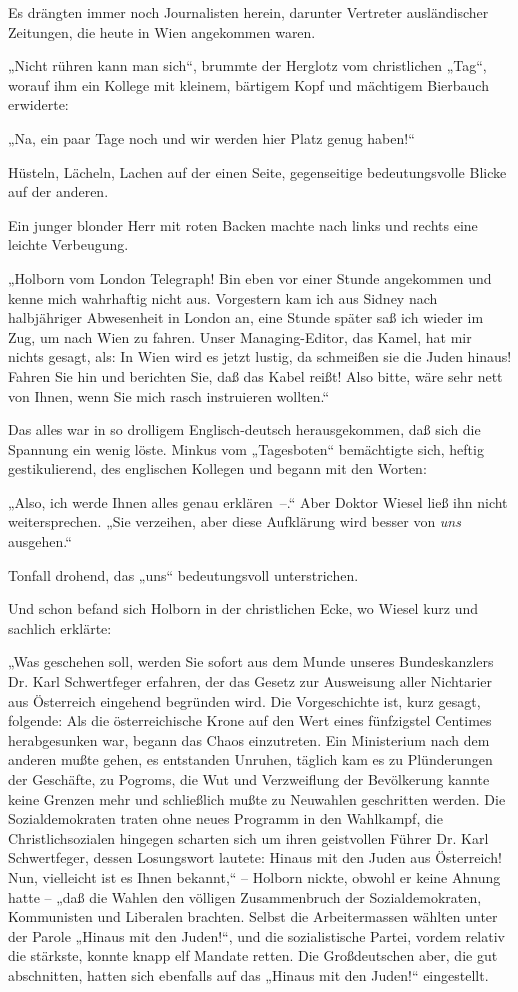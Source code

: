 Es drängten immer noch Journalisten herein, darunter Vertreter
ausländischer Zeitungen, die heute in Wien angekommen waren.

„Nicht rühren kann man sich“, brummte der Herglotz vom christlichen
„Tag“, worauf ihm ein Kollege mit kleinem, bärtigem Kopf und
mächtigem Bierbauch erwiderte:

„Na, ein paar Tage noch und wir werden hier Platz genug haben!“

Hüsteln, Lächeln, Lachen auf der einen Seite, gegenseitige
bedeutungsvolle Blicke auf der anderen.

Ein junger blonder Herr mit roten Backen machte nach
links und rechts eine leichte Verbeugung.

„Holborn vom \glq{}London Telegraph\grq{}! Bin eben vor einer Stunde
angekommen und kenne mich wahrhaftig nicht aus. Vorgestern kam ich
aus Sidney nach halbjähriger Abwesenheit in London an, eine Stunde
später saß ich wieder im Zug, um nach Wien zu fahren. Unser
Managing-Editor, das Kamel, hat mir nichts gesagt, als: In Wien
wird es jetzt lustig, da schmeißen sie die Juden hinaus! Fahren Sie
hin und berichten Sie, daß das Kabel reißt! Also bitte, wäre sehr
nett von Ihnen, wenn Sie mich rasch instruieren wollten.“

Das alles war in so drolligem Englisch-deutsch herausgekommen, daß
sich die Spannung ein wenig löste. Minkus vom „Tagesboten“
bemächtigte sich, heftig gestikulierend, des englischen Kollegen
und begann mit den Worten:

„Also, ich werde Ihnen alles genau erklären~–.“ Aber Doktor Wiesel
ließ ihn nicht weitersprechen. „Sie verzeihen, aber diese
Aufklärung wird besser von \emph{uns} ausgehen.“

Tonfall drohend, das „uns“ bedeutungsvoll unterstrichen.

Und schon befand sich Holborn in der christlichen Ecke, wo Wiesel
kurz und sachlich erklärte:

„Was geschehen soll, werden Sie sofort aus dem Munde unseres
Bundeskanzlers Dr. Karl Schwertfeger erfahren, der das Gesetz zur
Ausweisung aller Nichtarier aus Österreich eingehend begründen
wird. Die Vorgeschichte ist, kurz gesagt, folgende: Als die
österreichische Krone auf den Wert  eines fünfzigstel
Centimes herabgesunken war, begann das Chaos einzutreten. Ein
Ministerium nach dem anderen mußte gehen, es entstanden Unruhen,
täglich kam es zu Plünderungen der Geschäfte, zu Pogroms, die Wut
und Verzweiflung der Bevölkerung kannte keine Grenzen mehr und
schließlich mußte zu Neuwahlen geschritten werden. Die
Sozialdemokraten traten ohne neues Programm in den Wahlkampf, die
Christlichsozialen hingegen scharten sich um ihren geistvollen
Führer Dr. Karl Schwertfeger, dessen Losungswort lautete: Hinaus
mit den Juden aus Österreich! Nun, vielleicht ist es Ihnen
bekannt,“ – Holborn nickte, obwohl er keine Ahnung hatte – „daß die
Wahlen den völligen Zusammenbruch der Sozialdemokraten, Kommunisten
und Liberalen brachten. Selbst die Arbeitermassen wählten unter der
Parole „Hinaus mit den Juden!“, und die sozialistische Partei,
vordem relativ die stärkste, konnte knapp elf Mandate retten. Die
Großdeutschen aber, die gut abschnitten, hatten sich ebenfalls auf
das „Hinaus mit den Juden!“ eingestellt.


